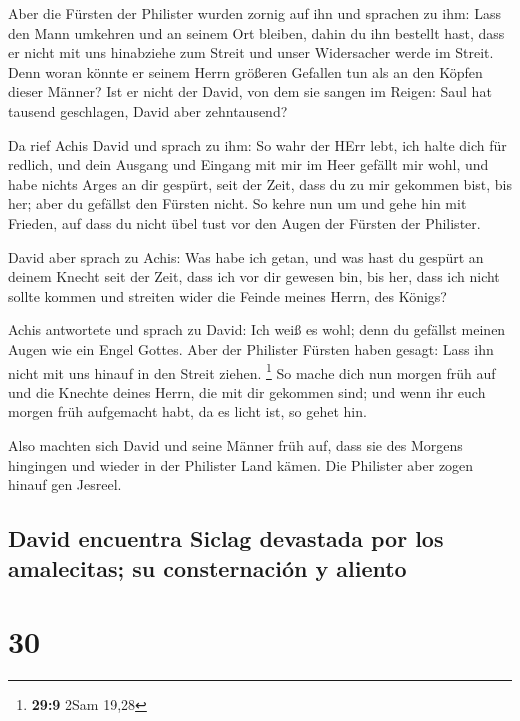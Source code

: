  Aber die Fürsten der Philister wurden zornig auf ihn und
sprachen zu ihm: Lass den Mann umkehren und an seinem Ort bleiben, dahin
du ihn bestellt hast, dass er nicht mit uns hinabziehe zum Streit und
unser Widersacher werde im Streit. Denn woran könnte er seinem Herrn
größeren Gefallen tun als an den Köpfen dieser Männer? 
Ist er nicht der David, von dem sie sangen im Reigen: Saul hat tausend
geschlagen, David aber zehntausend?

 Da rief Achis David und sprach zu ihm: So wahr der HErr
lebt, ich halte dich für redlich, und dein Ausgang und Eingang mit mir
im Heer gefällt mir wohl, und habe nichts Arges an dir gespürt, seit der
Zeit, dass du zu mir gekommen bist, bis her; aber du gefällst den
Fürsten nicht.  So kehre nun um und gehe hin mit Frieden,
auf dass du nicht übel tust vor den Augen der Fürsten der Philister.

 David aber sprach zu Achis: Was habe ich getan, und was
hast du gespürt an deinem Knecht seit der Zeit, dass ich vor dir gewesen
bin, bis her, dass ich nicht sollte kommen und streiten wider die Feinde
meines Herrn, des Königs?

 Achis antwortete und sprach zu David: Ich weiß es wohl;
denn du gefällst meinen Augen wie ein Engel Gottes. Aber der Philister
Fürsten haben gesagt: Lass ihn nicht mit uns hinauf in den Streit
ziehen. \footnote{\textbf{29:9} 2Sam 19,28}  So mache
dich nun morgen früh auf und die Knechte deines Herrn, die mit dir
gekommen sind; und wenn ihr euch morgen früh aufgemacht habt, da es
licht ist, so gehet hin.

 Also machten sich David und seine Männer früh auf, dass
sie des Morgens hingingen und wieder in der Philister Land kämen. Die
Philister aber zogen hinauf gen Jesreel.

\hypertarget{david-encuentra-siclag-devastada-por-los-amalecitas-su-consternaciuxf3n-y-aliento}{%
\subsection{David encuentra Siclag devastada por los amalecitas; su
consternación y
aliento}\label{david-encuentra-siclag-devastada-por-los-amalecitas-su-consternaciuxf3n-y-aliento}}

\hypertarget{section-29}{%
\section{30}\label{section-29}}

